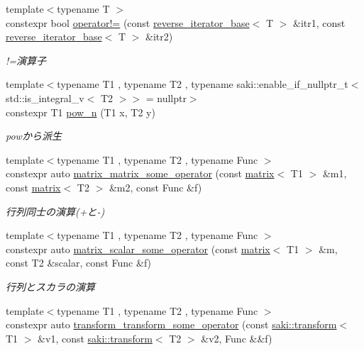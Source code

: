 \begin{DoxyCompactItemize}
{\footnotesize template$<$typename T $>$ }\\constexpr bool \mbox{\hyperlink{namespacesaki_1_1details_a67a43f1e216aa1da9934815a21bfe2ee}{operator!=}} (const \mbox{\hyperlink{classsaki_1_1details_1_1reverse__iterator__base}{reverse\+\_\+iterator\+\_\+base}}$<$ T $>$ \&itr1, const \mbox{\hyperlink{classsaki_1_1details_1_1reverse__iterator__base}{reverse\+\_\+iterator\+\_\+base}}$<$ T $>$ \&itr2)
\begin{DoxyCompactList}\small\item\em !=演算子 \end{DoxyCompactList}\item 
{\footnotesize template$<$typename T1 , typename T2 , typename saki\+::enable\+\_\+if\+\_\+nullptr\+\_\+t$<$ std\+::is\+\_\+integral\+\_\+v$<$ T2 $>$$>$  = nullptr$>$ }\\constexpr T1 \mbox{\hyperlink{namespacesaki_1_1details_a30b4cd78c970618ee2886123c28e4041}{pow\+\_\+n}} (T1 x, T2 y)
\begin{DoxyCompactList}\small\item\em powから派生 \end{DoxyCompactList}\item 
{\footnotesize template$<$typename T1 , typename T2 , typename Func $>$ }\\constexpr auto \mbox{\hyperlink{namespacesaki_1_1details_a95cd387e134b1b940cde0b171926e01e}{matrix\+\_\+matrix\+\_\+some\+\_\+operator}} (const \mbox{\hyperlink{classsaki_1_1matrix}{matrix}}$<$ T1 $>$ \&m1, const \mbox{\hyperlink{classsaki_1_1matrix}{matrix}}$<$ T2 $>$ \&m2, const Func \&f)
\begin{DoxyCompactList}\small\item\em 行列同士の演算(+と-\/) \end{DoxyCompactList}\item 
{\footnotesize template$<$typename T1 , typename T2 , typename Func $>$ }\\constexpr auto \mbox{\hyperlink{namespacesaki_1_1details_aa3d3214e16ce99b6f4aca7d61d41077f}{matrix\+\_\+scalar\+\_\+some\+\_\+operator}} (const \mbox{\hyperlink{classsaki_1_1matrix}{matrix}}$<$ T1 $>$ \&m, const T2 \&scalar, const Func \&f)
\begin{DoxyCompactList}\small\item\em 行列とスカラの演算 \end{DoxyCompactList}\item 
{\footnotesize template$<$typename T1 , typename T2 , typename Func $>$ }\\constexpr auto \mbox{\hyperlink{namespacesaki_1_1details_a9cc45efebcefc4c153ed6ddd63de93f7}{transform\+\_\+transform\+\_\+some\+\_\+operator}} (const \mbox{\hyperlink{classsaki_1_1transform}{saki\+::transform}}$<$ T1 $>$ \&v1, const \mbox{\hyperlink{classsaki_1_1transform}{saki\+::transform}}$<$ T2 $>$ \&v2, Func \&\&f)

\end{DoxyCompactItemize}
